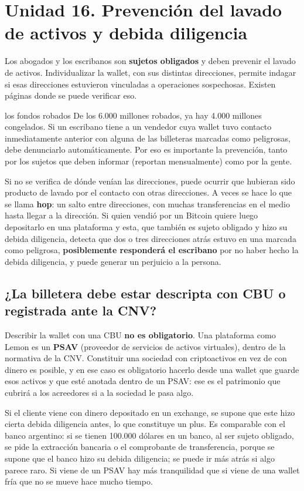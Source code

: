 \documentclass[12pt,oneside,a4paper]{book}
\begin{document}
\section{Unidad 16. Prevención del lavado de activos y debida diligencia}

Los abogados y los escribanos son \textbf{sujetos obligados} y deben prevenir el lavado de activos. Individualizar la wallet, con sus distintas direcciones, permite indagar si esas direcciones estuvieron vinculadas a operaciones sospechosas. Existen páginas donde se puede verificar eso.

\begin{example}{los fondos robados}
De los 6.000 millones robados, ya hay 4.000 millones congelados. Si un escribano tiene a un vendedor cuya wallet tuvo contacto inmediatamente anterior con alguna de las billeteras marcadas como peligrosas, debe denunciarlo automáticamente. Por eso es importante la prevención, tanto por los sujetos que deben informar (reportan mensualmente) como por la gente.
\end{example}

Si no se verifica de dónde venían las direcciones, puede ocurrir que hubieran sido producto de lavado por el contacto con otras direcciones. A veces se hace lo que se llama \textbf{hop}: un salto entre direcciones, con muchas transferencias en el medio hasta llegar a la dirección. Si quien vendió por un Bitcoin quiere luego depositarlo en una plataforma y esta, que también es sujeto obligado y hizo su debida diligencia, detecta que dos o tres direcciones atrás estuvo en una marcada como peligrosa, \textbf{posiblemente responderá el escribano} por no haber hecho la debida diligencia, y puede generar un perjuicio a la persona.

\subsection{¿La billetera debe estar descripta con CBU o registrada ante la CNV?}

Describir la wallet con una CBU \textbf{no es obligatorio}. Una plataforma como Lemon es un \textbf{PSAV} (proveedor de servicios de activos virtuales), dentro de la normativa de la CNV. Constituir una sociedad con criptoactivos en vez de con dinero es posible, y en ese caso es obligatorio hacerlo desde una wallet que guarde esos activos y que esté anotada dentro de un PSAV: ese es el patrimonio que cubrirá a los acreedores si a la sociedad le pasa algo.

Si el cliente viene con dinero depositado en un exchange, se supone que este hizo cierta debida diligencia antes, lo que constituye un plus. Es comparable con el banco argentino: si se tienen 100.000 dólares en un banco, al ser sujeto obligado, se pide la extracción bancaria o el comprobante de transferencia, porque se supone que el banco hizo su debida diligencia; se puede ir más atrás si algo parece raro. Si viene de un PSAV hay más tranquilidad que si viene de una wallet fría que no se mueve hace mucho tiempo.
\end{document}
